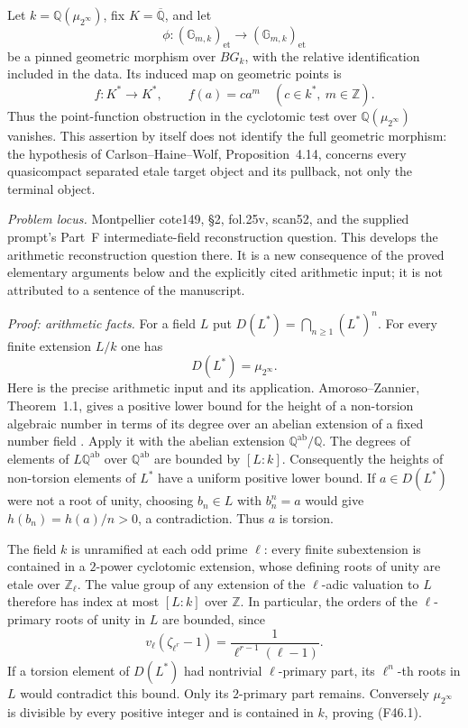 Let $k=\mathbb Q(\mu_{2^\infty})$, fix $K=\overline{\mathbb Q}$, and let
\[
 \phi:(\mathbb G_{m,k})_{\mathrm{et}}
       \longrightarrow(\mathbb G_{m,k})_{\mathrm{et}}
\]
be a pinned geometric morphism over $B G_k$, with the relative
identification included in the data. Its induced map on geometric
points is
\[
 f:K^*\longrightarrow K^*,\qquad f(a)=c a^m
 \quad(c\in k^*,\ m\in\mathbb Z).
 \tag{F46}
\]
Thus the point-function obstruction in the cyclotomic test over
$\mathbb Q(\mu_{2^\infty})$ vanishes. This assertion by itself does not identify the full geometric
morphism: the hypothesis of Carlson--Haine--Wolf,
Proposition~4.14, concerns every quasicompact separated etale target
object and its pullback, not only the terminal object.

\emph{Problem locus.} Montpellier cote149, \S2, fol.25v, scan52,
and the supplied prompt's Part~F intermediate-field reconstruction question.
This develops the arithmetic reconstruction question there.
It is a new consequence of the proved elementary arguments
below and the explicitly cited arithmetic input; it is not attributed
to a sentence of the manuscript.

\emph{Proof: arithmetic facts.}
For a field $L$ put $D(L^*)=\bigcap_{n\geq1}(L^*)^n$.
For every finite extension $L/k$ one has
\[
 D(L^*)=\mu_{2^\infty}.                                      \tag{F46.1}
\]
Here is the precise arithmetic input and its application.
Amoroso--Zannier, Theorem~1.1, gives a positive lower bound for the
height of a non-torsion algebraic number in terms of its degree over
an abelian extension of a fixed number field
\citep{AmorosoZannier2000}. Apply it with the abelian extension
$\mathbb Q^{\mathrm{ab}}/\mathbb Q$. The degrees of elements of
$L\mathbb Q^{\mathrm{ab}}$ over $\mathbb Q^{\mathrm{ab}}$ are bounded
by $[L:k]$. Consequently the heights of non-torsion elements of $L^*$
have a uniform positive lower bound. If $a\in D(L^*)$ were not a root
of unity, choosing $b_n\in L$ with $b_n^n=a$ would give
$h(b_n)=h(a)/n>0$, a contradiction. Thus $a$ is torsion.

The field $k$ is unramified at each odd prime $\ell$: every finite
subextension is contained in a $2$-power cyclotomic extension, whose
defining roots of unity are etale over $\mathbb Z_\ell$. The value
group of any extension of the $\ell$-adic valuation to $L$ therefore
has index at most $[L:k]$ over $\mathbb Z$. In particular, the orders
of the $\ell$-primary roots of unity in $L$ are bounded, since
\[
 v_\ell(\zeta_{\ell^r}-1)
       =\frac{1}{\ell^{r-1}(\ell-1)}.
\]
If a torsion element of $D(L^*)$ had nontrivial $\ell$-primary part,
its $\ell^n$-th roots in $L$ would contradict this bound. Only its
$2$-primary part remains. Conversely $\mu_{2^\infty}$ is divisible
by every positive integer and is contained in $k$, proving (F46.1).

